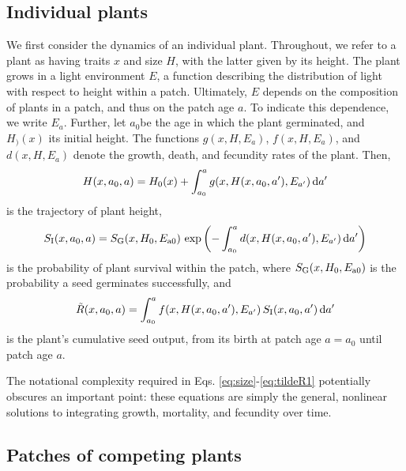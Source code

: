 \documentclass[10pt,twoside]{article}
\begin{document}
\subsection{Individual plants}\label{individual-plants}

We first consider the dynamics of an individual plant. Throughout, we refer to a
plant as having traits \(x\) and size \(H\), with the latter given by its height. The
plant grows in a light environment \(E\), a function describing the distribution
of light with respect to height within a patch. Ultimately, \(E\) depends on the
composition of plants in a patch, and thus on the patch age \(a\). To indicate this dependence, we
write \(E_a\). Further, let \(a_0\)be the age in which the plant germinated, and \(H_)(x)\) its initial height. The functions \(g(x, H, E_a)\), \(f(x, H, E_a)\), and
\(d(x, H, E_a)\) denote the growth, death, and fecundity rates of the
plant. Then,
\begin{equation} \label{eq:size}
H(x, a_0, a) = H_0(x) + \int_{a_0}^{a} g(x, H(x, a_0, a^\prime), E_{a^\prime}) \, {\rm d}a^\prime
\end{equation}
is the trajectory of plant height,
\begin{equation} \label{eq:survivalIndividual}
S_{\rm I} (x, a_0, a) = S_{\rm G} (x, H_0, E_{{\rm a}0}) \, \exp\left(- \int_{a_0}^{a} d(x, H(x, a_0, a^\prime), E_{a^\prime}) \, {\rm d} a^\prime \right)
\end{equation}
is the probability of plant survival within the patch, where \(S_{\rm G} (x, H_0, E_{{\rm a}0})\)
is the probability a seed germinates successfully, and
\begin{equation} \label{eq:tildeR1}
\tilde{R}(x, a_0, a) = \int_{a_0}^{a} f(x, H(x, a_0, a^\prime), E_{a^\prime}) \, S_{\rm I} (x, a_0, a^\prime) \, {\rm d} a^\prime
\end{equation}
is the plant's cumulative seed output, from its birth at patch age
\(a = a_0\) until patch age $a$.

The notational complexity required in Eqs. \ref{eq:size}-\ref{eq:tildeR1} potentially obscures an important point: these equations are simply the general, nonlinear solutions to
integrating growth, mortality, and fecundity over time.

\subsection{Patches of competing plants}\label{patches-of-competing-plants-size-structured-populations}
\end{document}

